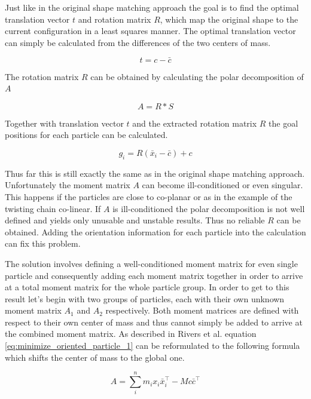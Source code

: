 Just like in the original shape matching approach the goal is to find the optimal translation vector $t$ and rotation matrix $R$, which map the original shape to the current configuration in a least squares manner. The optimal translation vector can simply be calculated from the differences of the two centers of mass.

\begin{equation}
t = c - \bar{c}
\end{equation}

The rotation matrix $R$ can be obtained by calculating the polar decomposition of $A$

\begin{equation}
A = R*S
\end{equation}

Together with translation vector $t$ and the extracted rotation matrix $R$ the goal positions for each particle can be calculated.

\begin{equation}
g_i = R(\bar{x}_i-\bar{c})+c
\end{equation}

Thus far this is still exactly the same as in the original shape matching approach. Unfortunately  the moment matrix $A$ can become ill-conditioned or even singular. This happens if the particles are close to co-planar or as in the example of the twisting chain co-linear. If $A$ is ill-conditioned the polar decomposition is not well defined and yields only unusable and unstable results. Thus no reliable $R$ can be obtained. Adding the orientation information for each particle into the calculation can fix this problem.

The solution involves defining a well-conditioned moment matrix for even single particle and consequently adding each moment matrix together in order to arrive at a total moment matrix for the whole particle group. In order to get to this result let's begin with two groups of particles, each with their own unknown moment matrix $A_1$ and $A_2$ respectively. Both moment matrices are defined with respect to their own center of mass and thus cannot simply be added to arrive at the combined moment matrix. As described in Rivers et al. \cite{Rivers:2007te} equation \ref{eq:minimize_oriented_particle_1} can be reformulated to the following formula which shifts the center of mass to the global one.

\begin{equation}
A = \sum\limits_i^n m_ix_i\bar{x}_i^\top - Mc\bar{c}^\top
\label{eq:minimize_oriented_particle_2}
\end{equation}

